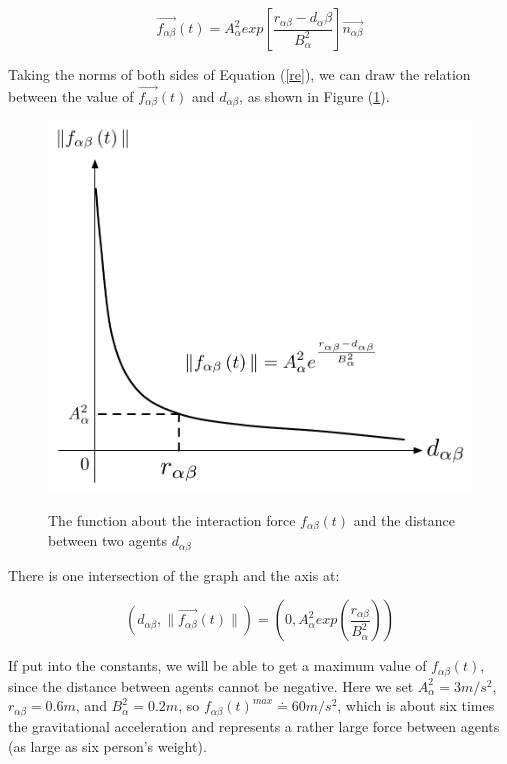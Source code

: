 \begin{equation}\label{re}
\overrightarrow{f_{\alpha\beta}}(t) = A_{\alpha}^{2} exp\left[ \frac{r_{\alpha\beta} - d_{\alpha}\beta}{B_{\alpha}^{2}}\right]  \overrightarrow{n_{\alpha\beta}}
\end{equation}

Taking the norms of both sides of Equation (\ref{re}), we can draw the relation between the value of $\overrightarrow{f_{\alpha\beta}}(t)$ and $ d_{\alpha\beta} $, as shown in Figure 
(\ref{physicalinteraction}).\\

\begin{figure}
    \centering
    {\includegraphics[scale=0.45]{Figures/physicalinteraction.pdf}} 
    \caption{The function about the interaction force 
        $f_{\alpha\beta}(t)$ and the distance between two agents
        $d_{\alpha \beta}$ }
    \label{physicalinteraction}
\end{figure}

There is one intersection of the graph and the  axis at:

\begin{equation}
	\left( d_{\alpha \beta} , \| \vec{f_{\alpha \beta}} \left( t \right) \| \right)
 =
	\left( 0 , A_{\alpha}^{2} exp\left( \frac{r_{\alpha\beta} }{B_{\alpha}^{2}}\right)  \right) 
\end{equation}

If put into the constants, we will be able to get a maximum value of $ f_{\alpha\beta}(t) $, 
since the distance between agents cannot be negative. Here we set $ A_{\alpha}^{2} = 3 m/s^{2} $, 
$ r_{\alpha\beta} = 0.6 m $, and $ B_{\alpha}^{2} = 0.2 m $, so 
$ f_{\alpha\beta}(t)^{max} \doteq 60 m/s^{2} $, which is about six times the gravitational 
acceleration and represents a rather large force between agents (as large as six person's weight).

